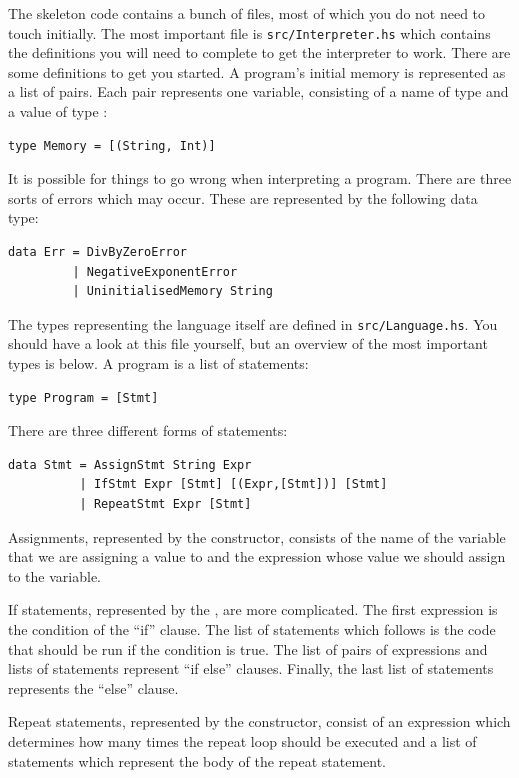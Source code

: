 The skeleton code contains a bunch of files, most of which you do not need to touch initially. The most important file is \texttt{\small src/Interpreter.hs} which contains the definitions you will need to complete to get the interpreter to work. There are some definitions to get you started. A program's initial memory is represented as a list of pairs. Each pair represents one variable, consisting of a name of type  and a value of type :
\begin{verbatim}
type Memory = [(String, Int)]
\end{verbatim}
It is possible for things to go wrong when interpreting a program. There are three sorts of errors which may occur. These are represented by the following data type:
\begin{verbatim}
data Err = DivByZeroError 
         | NegativeExponentError 
         | UninitialisedMemory String
\end{verbatim}
The types representing the language itself are defined in \texttt{\small src/Language.hs}. You should have a look at this file yourself, but an overview of the most important types is below. A program is a list of statements:
\begin{verbatim}
type Program = [Stmt]
\end{verbatim}
There are three different forms of statements: 
\begin{verbatim}
data Stmt = AssignStmt String Expr
          | IfStmt Expr [Stmt] [(Expr,[Stmt])] [Stmt]
          | RepeatStmt Expr [Stmt]
\end{verbatim}
Assignments, represented by the  constructor, consists of the name of the variable that we are assigning a value to and the expression whose value we should assign to the variable. 

If statements, represented by the , are more complicated. The first expression is the condition of the ``if'' clause. The list of statements which follows is the code that should be run if the condition is true. The list of pairs of expressions and lists of statements represent ``if else'' clauses. Finally, the last list of statements represents the ``else'' clause.

Repeat statements, represented by the  constructor, consist of an expression which determines how many times the repeat loop should be executed and a list of statements which represent the body of the repeat statement.

